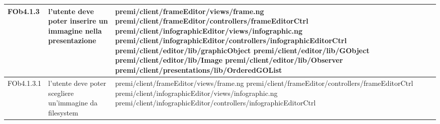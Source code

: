 \begin{longtable}{|l|p{5cm}|p{7cm}|}
FOb4.1.3 & l'utente deve poter inserire un immagine nella presentazione & \hspace{0pt}premi/client/frameEditor/views/frame.ng \linebreak \linebreak premi/client/frameEditor/controllers/frameEditorCtrl \linebreak \linebreak premi/client/infographicEditor/views/infographic.ng \linebreak \linebreak premi/client/infographicEditor/controllers/infographicEditorCtrl \linebreak \linebreak premi/client/editor/lib/graphicObject \linebreak \linebreak premi/client/editor/lib/GObject \linebreak \linebreak premi/client/editor/lib/Image \linebreak \linebreak premi/client/editor/lib/Observer \linebreak \linebreak premi/client/presentations/lib/OrderedGOList  \\
\hline
FOb4.1.3.1 & l'utente deve poter scegliere un'immagine da filesystem &  \hspace{0pt}premi/client/frameEditor/views/frame.ng \linebreak \linebreak premi/client/frameEditor/controllers/frameEditorCtrl \linebreak \linebreak premi/client/infographicEditor/views/infographic.ng \linebreak \linebreak premi/client/infographicEditor/controllers/infographicEditorCtrl \\
\hline

\end{longtable}
